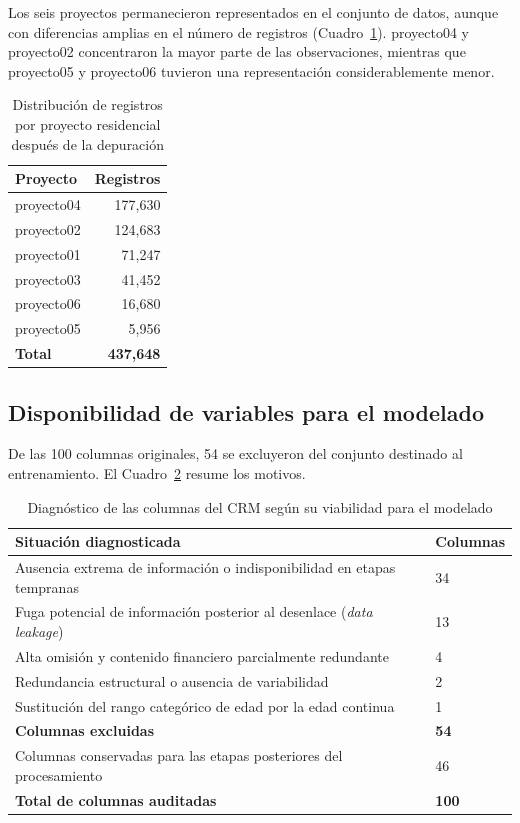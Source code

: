 Los seis proyectos permanecieron representados en el conjunto de datos, aunque con diferencias amplias en el número de registros (Cuadro~\ref{cuad:proyectos}). proyecto04 y proyecto02 concentraron la mayor parte de las observaciones, mientras que proyecto05 y proyecto06 tuvieron una representación considerablemente menor.

\begin{table}[H]
\centering
\caption{Distribución de registros por proyecto residencial después de la depuración}
\label{cuad:proyectos}
\begin{tabular}{lr}
\hline
\textbf{Proyecto} & \textbf{Registros} \\
\hline
proyecto04          & 177{,}630 \\
proyecto02  & 124{,}683 \\
proyecto01           &  71{,}247 \\
proyecto03            &  41{,}452 \\
proyecto06 &  16{,}680 \\
proyecto05          &   5{,}956 \\
\hline
\textbf{Total}  & \textbf{437{,}648} \\
\hline
\end{tabular}
\fuentepropia
\end{table}

\subsection{Disponibilidad de variables para el modelado}
\label{subsec:diagnostico-datos}

De las 100 columnas originales, 54 se excluyeron del conjunto destinado al entrenamiento. El Cuadro~\ref{tab:columnas-diagnosticadas} resume los motivos.

\begin{table}[H]
\centering
\caption{Diagnóstico de las columnas del CRM según su viabilidad para el modelado}
\label{tab:columnas-diagnosticadas}
\begin{tabular}{p{10.5cm}p{2.5cm}}
\hline
\textbf{Situación diagnosticada} & \textbf{Columnas} \\ \hline
Ausencia extrema de información o indisponibilidad en etapas tempranas & 34 \\
Fuga potencial de información posterior al desenlace (\textit{data leakage}) & 13 \\
Alta omisión y contenido financiero parcialmente redundante & 4 \\
Redundancia estructural o ausencia de variabilidad & 2 \\
Sustitución del rango categórico de edad por la edad continua & 1 \\ \hline
\textbf{Columnas excluidas} & \textbf{54} \\
Columnas conservadas para las etapas posteriores del procesamiento & 46 \\ \hline
\textbf{Total de columnas auditadas} & \textbf{100} \\ \hline
\end{tabular}
\fuentepropia
\end{table}

